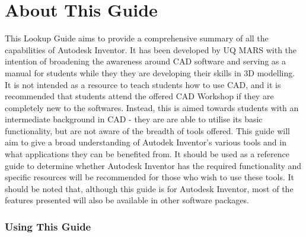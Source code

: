 \chapter{About This Guide}

This Lookup Guide aims to provide a comprehensive summary of all the capabilities of Autodesk Inventor. It has been developed by UQ MARS with the intention of broadening the awareness around CAD software and serving as a manual for students while they they are developing their skills in 3D modelling. It is not intended as a resource to teach students how to use CAD, and it is recommended that students attend the offered CAD Workshop if they are completely new to the softwares. Instead, this is aimed towards students with an intermediate background in CAD - they are are able to utilise its basic functionality, but are not aware of the breadth of tools offered. This guide will aim to give a broad understanding of Autodek Inventor's various tools and in what applications they can be benefited from. It should be used as a reference guide to determine whether Autodesk Inventor has the required functionality and specific resources will be recommended for those who wish to use these tools. It should be noted that, although this guide is for Autodesk Inventor, most of the features presented will also be available in other software packages.

\subsection{Using This Guide}
